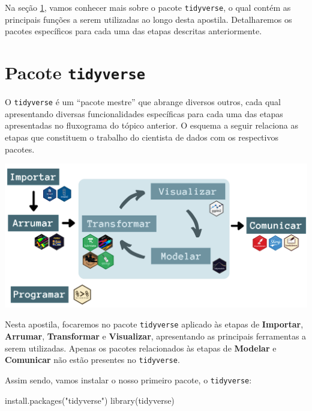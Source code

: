 \documentclass[
  brazilian,
]{book}
\newenvironment{Shaded}{\begin{snugshade}}{\end{snugshade}}
\newcommand{\FunctionTok}[1]{\textcolor[rgb]{0.00,0.00,0.00}{#1}}
\newcommand{\NormalTok}[1]{#1}
\newcommand{\StringTok}[1]{\textcolor[rgb]{0.31,0.60,0.02}{#1}}
\let\origfigure\figure
\let\endorigfigure\endfigure
\renewenvironment{figure}[1][2] {
    \expandafter\origfigure\expandafter[H]
} {
    \endorigfigure
}
\begin{document}
Na seção \ref{pacote}, vamos conhecer mais sobre o pacote \texttt{tidyverse}, o qual contém as principais funções a serem utilizadas ao longo desta apostila. Detalharemos os pacotes específicos para cada uma das etapas descritas anteriormente.

\hypertarget{pacote}{%
\section{\texorpdfstring{Pacote \texttt{tidyverse}}{Pacote tidyverse}}\label{pacote}}

O \texttt{tidyverse} é um ``pacote mestre'' que abrange diversos outros, cada qual apresentando diversas funcionalidades específicas para cada uma das etapas apresentadas no fluxograma do tópico anterior. O esquema a seguir relaciona as etapas que constituem o trabalho do cientista de dados com os respectivos pacotes.

\begin{figure}

{\centering \includegraphics[width=1\linewidth]{imagens/pacotes_cd} 

}

\caption{Para cada etapa do fluxograma de trabalho da ciência de dados, existem pacotes específicos no R.}\label{fig:unnamed-chunk-3}
\end{figure}

Nesta apostila, focaremos no pacote \texttt{tidyverse} aplicado às etapas de \textbf{Importar}, \textbf{Arrumar}, \textbf{Transformar} e \textbf{Visualizar}, apresentando as principais ferramentas a serem utilizadas. Apenas os pacotes relacionados às etapas de \textbf{Modelar} e \textbf{Comunicar} não estão presentes no \texttt{tidyverse}.

Assim sendo, vamos instalar o nosso primeiro pacote, o \texttt{tidyverse}:

\begin{Shaded}
\begin{Highlighting}[]
\FunctionTok{install.packages}\NormalTok{(}\StringTok{"tidyverse"}\NormalTok{)}
\FunctionTok{library}\NormalTok{(tidyverse)}
\end{Highlighting}
\end{Shaded}
\end{document}

